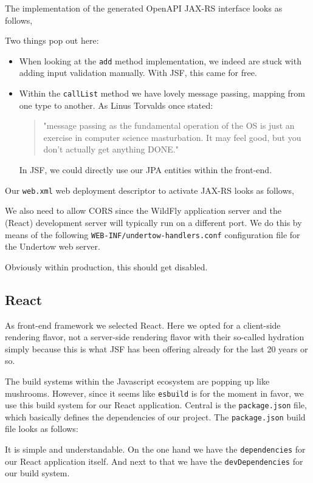 The implementation of the generated OpenAPI JAX-RS interface looks as follows,

Two things pop out here:
\begin{itemize}
	\item When looking at the \texttt{add} method implementation, we indeed are stuck with adding input validation manually.
	With JSF, this came for free.
	\item Within the \texttt{callList} method we have lovely message passing, mapping from one type to another.
	As Linus Torvalds once stated:
	\begin{quote}
		"message passing as the fundamental operation of the OS is just an exercise in computer science masturbation.
		It may feel good, but you don’t actually get anything DONE."
	\end{quote}
	In JSF, we could directly use our JPA entities within the front-end.
\end{itemize}

Our \texttt{web.xml} web deployment descriptor to activate JAX-RS looks as follows,


We also need to allow CORS since the WildFly application server and the (React) development server will typically run on a different port.
We do this by means of the following \texttt{WEB-INF/undertow-handlers.conf} configuration file for the Undertow web server.

Obviously within production, this should get disabled.

\subsection{React}
As front-end framework we selected React.
Here we opted for a client-side rendering flavor, not a server-side rendering flavor with their so-called hydration simply because this is what JSF has been offering already for the last 20 years or so.

The build systems within the Javascript ecosystem are popping up like mushrooms.
However, since it seems like \texttt{esbuild} is for the moment in favor, we use this build system for our React application.
Central is the \texttt{package.json} file, which basically defines the dependencies of our project.
The \texttt{package.json} build file looks as follows:

It is simple and understandable.
On the one hand we have the \texttt{dependencies} for our React application itself.
And next to that we have the \texttt{devDependencies} for our build system.

